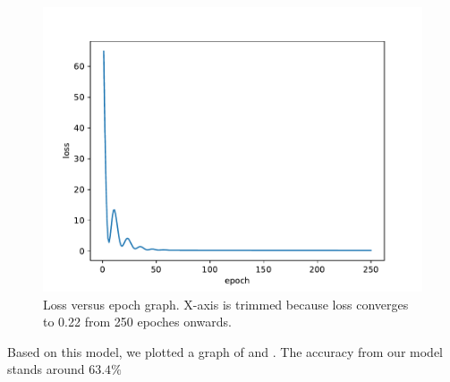 \documentclass[11pt,a4paper]{article}
\begin{document}
	\begin{figure}[H]
		\centering
		\includegraphics[width=1.0\linewidth]{pics/fig6}
		\caption{Loss versus epoch graph. X-axis is trimmed because loss converges to 0.22 from 250 epoches onwards.}
		\label{fig:fig6}
	\end{figure}
	
	
	Based on this model, we plotted a graph of \color{blue}{actual swings} \color{black} and \color{red}{predicted swings} \color{black}. The accuracy from our model stands around $63.4\%$
	
\end{document}
